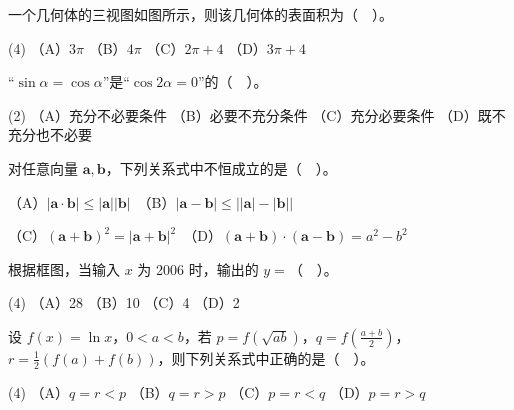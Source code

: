 \begin{question}

一个几何体的三视图如图所示，则该几何体的表面积为（　）。
\nopagebreak[4]
\begin{center}\end{center}
\nopagebreak[4]
\begin{gkopts}(4)
\task （A）$3\pi$
\task （B）$4\pi$
\task （C）$2\pi+4$
\task （D）$3\pi+4$
\end{gkopts}

\end{question}
\begin{question}

“$\sin\alpha=\cos\alpha$”是“$\cos2\alpha=0$”的（　）。

\begin{gkopts}(2)
\task （A）充分不必要条件
\task （B）必要不充分条件
\task （C）充分必要条件
\task （D）既不充分也不必要
\end{gkopts}

\end{question}
\begin{question}

对任意向量 $\boldsymbol a,\boldsymbol b$，下列关系式中不恒成立的是（　）。

   （A）$|\boldsymbol a\cdot\boldsymbol b|\leq|\boldsymbol a||\boldsymbol b|$　（B）$|\boldsymbol a-\boldsymbol b|\leq\bigl||\boldsymbol a|-|\boldsymbol b|\bigr|$

   （C）$(\boldsymbol a+\boldsymbol b)^2=|\boldsymbol a+\boldsymbol b|^2$　（D）$(\boldsymbol a+\boldsymbol b)\cdot(\boldsymbol a-\boldsymbol b)=a^2-b^2$

\Needspace{0.4\textheight}
\end{question}
\begin{question}

根据框图，当输入 $x$ 为 2006 时，输出的 $y=$（　）。
\nopagebreak[4]
\begin{center}\end{center}
\nopagebreak[4]
\begin{gkopts}(4)
\task （A）28
\task （B）10
\task （C）4
\task （D）2
\end{gkopts}

\end{question}
\begin{question}

设 $f(x)=\ln x$，$0<a<b$，若 $p=f(\sqrt{ab})$，$q=f(\frac{a+b}{2})$，$r=\frac12(f(a)+f(b))$，则下列关系式中正确的是（　）。

\begin{gkopts}(4)
\task （A）$q=r<p$
\task （B）$q=r>p$
\task （C）$p=r<q$
\task （D）$p=r>q$
\end{gkopts}

\end{question}
